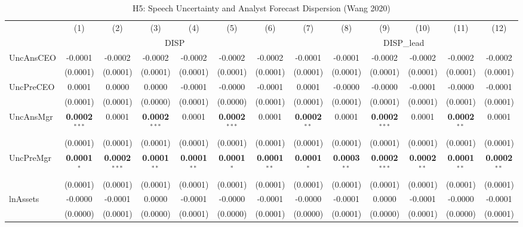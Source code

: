 \begin{landscape}
\begin{table}[H]
\setlength{\tabcolsep}{3pt}
\renewcommand{\arraystretch}{0.85}
\centering
\caption{H5: Speech Uncertainty and Analyst Forecast Dispersion (Wang 2020)}
\label{tab:h5}
\scriptsize
\begin{tabular}{lcccccccccccc}
\toprule
 & (1) & (2) & (3) & (4) & (5) & (6) & (7) & (8) & (9) & (10) & (11) & (12) \\
 & \multicolumn{6}{c}{DISP} & \multicolumn{6}{c}{DISP\_lead} \\
\cmidrule(lr){2-7} \cmidrule(lr){8-13}
\midrule
UncAnsCEO & -0.0001 & -0.0002 & -0.0002 & -0.0002 & -0.0002 & -0.0002 & -0.0001 & -0.0001 & -0.0002 & -0.0002 & -0.0002 & -0.0002 \\
 & (0.0001) & (0.0001) & (0.0001) & (0.0001) & (0.0001) & (0.0001) & (0.0001) & (0.0001) & (0.0001) & (0.0001) & (0.0001) & (0.0001) \\
UncPreCEO & 0.0001 & 0.0000 & 0.0000 & -0.0001 & -0.0000 & -0.0001 & 0.0001 & -0.0000 & -0.0000 & -0.0001 & -0.0000 & -0.0001 \\
 & (0.0001) & (0.0001) & (0.0000) & (0.0001) & (0.0000) & (0.0001) & (0.0001) & (0.0001) & (0.0001) & (0.0001) & (0.0001) & (0.0001) \\
UncAnsMgr & \textbf{0.0002}$^{***}$ & 0.0001 & \textbf{0.0002}$^{***}$ & 0.0001 & \textbf{0.0002}$^{***}$ & 0.0001 & \textbf{0.0002}$^{**}$ & 0.0001 & \textbf{0.0002}$^{***}$ & 0.0001 & \textbf{0.0002}$^{**}$ & 0.0001 \\
 & (0.0001) & (0.0001) & (0.0001) & (0.0001) & (0.0001) & (0.0001) & (0.0001) & (0.0001) & (0.0001) & (0.0001) & (0.0001) & (0.0001) \\
UncPreMgr & \textbf{0.0001}$^{*}$ & \textbf{0.0002}$^{***}$ & \textbf{0.0001}$^{**}$ & \textbf{0.0001}$^{**}$ & \textbf{0.0001}$^{*}$ & \textbf{0.0001}$^{**}$ & \textbf{0.0001}$^{*}$ & \textbf{0.0003}$^{**}$ & \textbf{0.0002}$^{***}$ & \textbf{0.0002}$^{**}$ & \textbf{0.0001}$^{**}$ & \textbf{0.0002}$^{**}$ \\
 & (0.0001) & (0.0001) & (0.0001) & (0.0001) & (0.0001) & (0.0001) & (0.0001) & (0.0001) & (0.0001) & (0.0001) & (0.0001) & (0.0001) \\
\midrule
lnAssets & -0.0000 & -0.0001 & 0.0000 & -0.0001 & -0.0000 & -0.0001 & -0.0000 & -0.0001 & 0.0000 & -0.0001 & -0.0000 & -0.0001 \\
 & (0.0000) & (0.0001) & (0.0000) & (0.0001) & (0.0000) & (0.0001) & (0.0000) & (0.0001) & (0.0000) & (0.0001) & (0.0000) & (0.0001) \\

\end{tabular}
\end{table}
\end{landscape}
